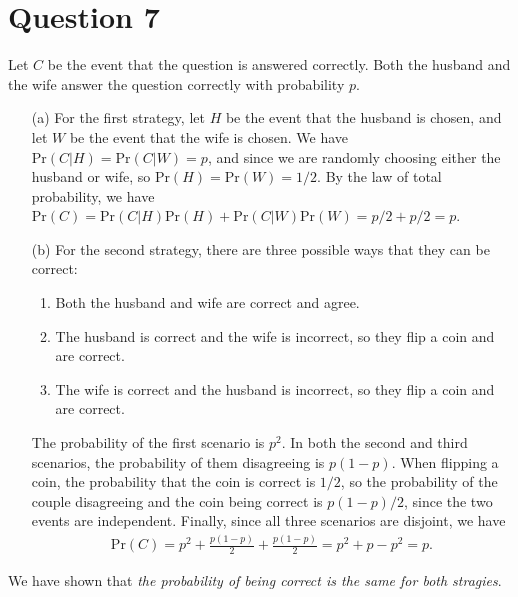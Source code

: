 \documentclass[10pt]{article}
\begin{document}
\section{Question 7} \noindent
Let \(C\) be the event that the question is answered correctly. Both the husband and the wife answer the question correctly with probability \(p\).
\begin{itemize}
    \item[(a)] For the first strategy, let \(H\) be the event that the husband is chosen, and let \(W\) be the event that the wife is 
    chosen. We have \(\mathrm{Pr}(C | H) = \mathrm{Pr}(C | W) = p\), and since 
    we are randomly choosing either the husband or wife, so \(\mathrm{Pr}(H) = \mathrm{Pr}(W) = 1/2\). By the law of total 
    probability, we have \(\mathrm{Pr}(C) = \mathrm{Pr}(C | H) \mathrm{Pr}(H) + \mathrm{Pr}(C | W) \mathrm{Pr}(W) = p/2 + p/2 = p\).
    \item[(b)] For the second strategy, there are three possible ways that they can be correct:
    \begin{enumerate}
        \item Both the husband and wife are correct and agree.
        \item The husband is correct and the wife is incorrect, so they flip a coin and are correct.
        \item The wife is correct and the husband is incorrect, so they flip a coin and are correct.
    \end{enumerate}
    The probability of the first scenario is \(p^2\). In both the second and third scenarios, the probability of them 
    disagreeing is \(p(1-p)\). When flipping a coin, the probability that the coin is correct is \(1/2\), so the probability
    of the couple disagreeing and the coin being correct is \(p(1-p)/2\), since the two events are independent. Finally, since all three
    scenarios are disjoint, we have 
    \begin{align*}
        \mathrm{Pr}(C) = p^2 + \frac{p(1-p)}{2} + \frac{p(1-p)}{2} = p^2 + p - p^2 = p.
    \end{align*}
\end{itemize}
We have shown that \textit{the probability of being correct is the same for both stragies}. 
\end{document}
